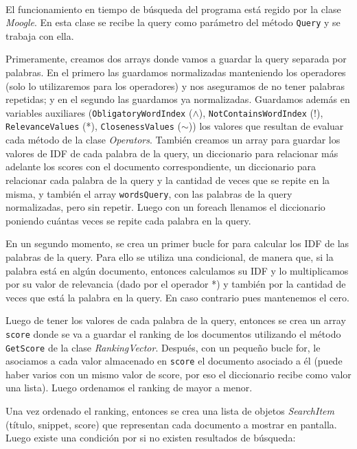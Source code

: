 \documentclass{article}
\begin{document}
\


El funcionamiento en tiempo de búsqueda del programa está regido por la clase {\textit{Moogle}}. En esta
clase se recibe la query como parámetro del método {\texttt{Query}} y se trabaja con ella.


Primeramente, creamos dos arrays donde vamos a guardar la query separada por palabras. En el
primero las guardamos normalizadas manteniendo los operadores (solo lo utilizaremos para los
operadores) y nos aseguramos de no tener palabras repetidas; y en el segundo las guardamos ya
normalizadas. Guardamos además en variables auxiliares ({\texttt{ObligatoryWordIndex}} ({\tiny $\land $}),
{\texttt{NotContainsWordIndex}} ({!}), {\texttt{RelevanceValues}} ({*}), {\texttt{ClosenessValues}} ($\sim $)) los valores que resultan
de evaluar cada método de la clase {\textit{Operators}}. También creamos un array para guardar los valores
de IDF de cada palabra de la query, un diccionario para relacionar más adelante los scores con el
documento correspondiente, un diccionario para relacionar cada palabra de la query y la cantidad de
veces que se repite en la misma, y también el array {\texttt{wordsQuery}}, con las palabras de la query
normalizadas, pero sin repetir. Luego con un foreach llenamos el diccionario poniendo cuántas veces
se repite cada palabra en la query.


En un segundo momento, se crea un primer bucle for para calcular los IDF de las palabras de la query.
Para ello se utiliza una condicional, de manera que, si la palabra está en algún documento, entonces
calculamos su IDF y lo multiplicamos por su valor de relevancia (dado por el operador {*}) y también
por la cantidad de veces que está la palabra en la query. En caso contrario pues mantenemos el cero.


Luego de tener los valores de cada palabra de la query, entonces se crea un array {\texttt{score}} donde se
va a guardar el ranking de los documentos utilizando el método {\texttt{GetScore}} de la clase {\textit{RankingVector}}.
Después, con un pequeño bucle for, le asociamos a cada valor almacenado en {\texttt{score}} el documento
asociado a él (puede haber varios con un mismo valor de score, por eso el diccionario recibe como
valor una lista). Luego ordenamos el ranking de mayor a menor.


Una vez ordenado el ranking, entonces se crea una lista de objetos {\textit{SearchItem}} (título, snippet, score)
que representan cada documento a mostrar en pantalla. Luego existe una condición por si no existen
resultados de búsqueda:
\end{document}
